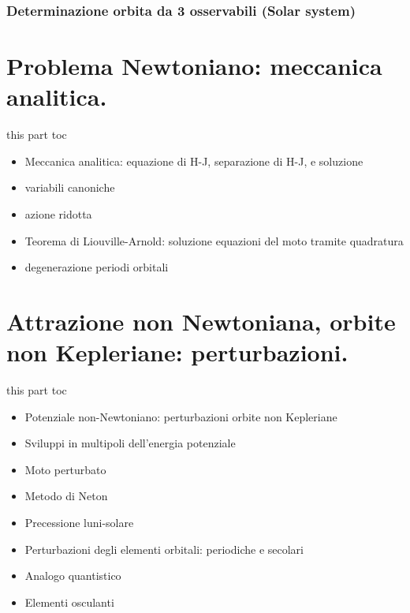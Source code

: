 \documentclass[10pt,xcolor={usenames},fleqn,mathserif,serif]{beamer}
\begin{document}


\section{Determinazione orbita da 3 osservabili (Solar system)}\label{sec:orbitobs}



\part{Problema Newtoniano: meccanica analitica.}\label{part:analitic}

\begin{frame}{this part toc}

\begin{itemize}

\item Meccanica analitica: equazione di H-J, separazione di H-J, e soluzione
\item variabili canoniche
\item azione ridotta
\item Teorema di Liouville-Arnold: soluzione equazioni del moto tramite quadratura
\item degenerazione periodi orbitali

\end{itemize}


\end{frame}



\part{Attrazione non Newtoniana, orbite non Kepleriane: perturbazioni.}\label{part:perturbation}

\begin{frame}{this part toc}

\begin{itemize}

\item Potenziale non-Newtoniano: perturbazioni orbite non Kepleriane
\item Sviluppi in multipoli dell'energia potenziale
\item Moto perturbato
\item Metodo di Neton
\item Precessione luni-solare
\item Perturbazioni degli elementi orbitali: periodiche e secolari
\item Analogo quantistico
\item Elementi osculanti

\end{itemize}

\end{frame} 
\end{document}
